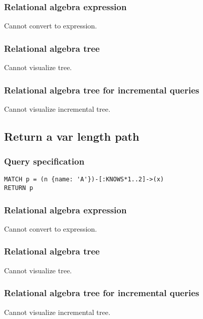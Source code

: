 \subsubsection*{Relational algebra expression}

Cannot convert to expression.

\subsubsection*{Relational algebra tree}

Cannot visualize tree.

\subsubsection*{Relational algebra tree for incremental queries}

Cannot visualize incremental tree.

\subsection{Return a var length path}

\subsubsection*{Query specification}

\begin{lstlisting}
MATCH p = (n {name: 'A'})-[:KNOWS*1..2]->(x)
RETURN p
\end{lstlisting}

\subsubsection*{Relational algebra expression}

Cannot convert to expression.

\subsubsection*{Relational algebra tree}

Cannot visualize tree.

\subsubsection*{Relational algebra tree for incremental queries}

Cannot visualize incremental tree.

